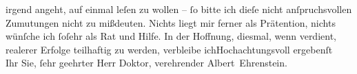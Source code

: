                     irgend angeht, auf einmal leſen zu wollen – ſo bitte ich dieſe nicht
                    anſpruchsvollen Zumutungen nicht zu mißdeuten. Nichts liegt mir ferner als
                    Prätention, nichts wünſche ich ſoſehr als Rat und Hilfe. In der Hoffnung,
                    diesmal, wenn verdient, realerer Erfolge teilhaftig zu werden, verbleibe
                        ich\hspace*{1.5em}Hochachtungsvoll ergebenſt{\\}Ihr Sie,
                    ſehr geehrter Herr Doktor, verehrender\pend
           \pstart \spacefill\mbox{Albert Ehrenstein.}\pend{}\endnumbering{}  
      